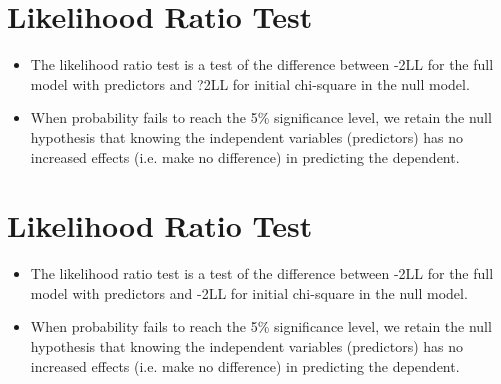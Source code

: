 \documentclass[a4paper,12pt]{article}
\begin{document}
\tableofcontents
\newpage


\section{Likelihood Ratio Test}
\begin{itemize}
	\item The likelihood ratio test is a test of the difference between -2LL for the full
	model with predictors and ?2LL for initial chi-square in the null model.
	\item When probability fails to reach the 5\% significance level, we retain the null hypothesis
	that knowing the independent variables (predictors) has no increased effects (i.e. make no
	difference) in predicting the dependent.
\end{itemize}






\section{Likelihood Ratio Test}
\begin{itemize}
	\item The likelihood ratio test is a test of the difference between -2LL for the full
	model with predictors and -2LL for initial chi-square in the null model.
	\item When probability fails to reach the 5\% significance level, we retain the null hypothesis
	that knowing the independent variables (predictors) has no increased effects (i.e. make no
	difference) in predicting the dependent.
\end{itemize}
\newpage
\end{document}
